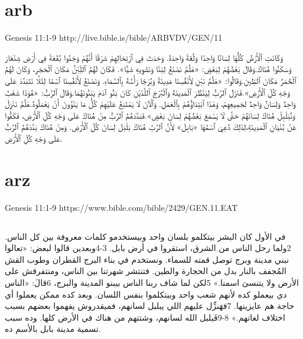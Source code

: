 \documentclass[12pt,fleqn,titlepage,twoside,a4paper]{book}
\begin{document}
\section{arb}

 Genesis 11:1-9 http://live.bible.is/bible/ARBVDV/GEN/11

\begin{arab}[utf]

وَكَانَتِ ٱلْأَرْضُ كُلُّهَا لِسَانًا وَاحِدًا وَلُغَةً وَاحِدَةً. وَحَدَثَ فِي ٱرْتِحَالِهِمْ شَرْقًا أَنَّهُمْ وَجَدُوا بُقْعَةً فِي أَرْضِ شِنْعَارَ وَسَكَنُوا هُنَاكَ.وَقَالَ بَعْضُهُمْ لِبَعْضٍ: «هَلُمَّ نَصْنَعُ لِبْنًا وَنَشْوِيهِ شَيًّا». فَكَانَ لَهُمُ ٱللِّبْنُ مَكَانَ ٱلْحَجَرِ، وَكَانَ لَهُمُ ٱلْحُمَرُ مَكَانَ ٱلطِّينِ.وَقَالُوا: «هَلُمَّ نَبْنِ لِأَنْفُسِنَا مَدِينَةً وَبُرْجًا رَأْسُهُ بِٱلسَّمَاءِ. وَنَصْنَعُ لِأَنْفُسِنَا ٱسْمًا لِئَلَّا نَتَبَدَّدَ عَلَى وَجْهِ كُلِّ ٱلْأَرْضِ».فَنَزَلَ ٱلرَّبُّ لِيَنْظُرَ ٱلْمَدِينَةَ وَٱلْبُرْجَ ٱللَّذَيْنِ كَانَ بَنُو آدَمَ يَبْنُونَهُمَا.وَقَالَ ٱلرَّبُّ: «هُوَذَا شَعْبٌ وَاحِدٌ وَلِسَانٌ وَاحِدٌ لِجَمِيعِهِمْ، وَهَذَا ٱبْتِدَاؤُهُمْ بِٱلْعَمَلِ. وَٱلْآنَ لَا يَمْتَنِعُ عَلَيْهِمْ كُلُّ مَا يَنْوُونَ أَنْ يَعْمَلُوهُ.هَلُمَّ نَنْزِلْ وَنُبَلْبِلْ هُنَاكَ لِسَانَهُمْ حَتَّى لَا يَسْمَعَ بَعْضُهُمْ لِسَانَ بَعْضٍ».فَبَدَّدَهُمُ ٱلرَّبُّ مِنْ هُنَاكَ عَلَى وَجْهِ كُلِّ ٱلْأَرْضِ، فَكَفُّوا عَنْ بُنْيَانِ ٱلْمَدِينَةِ،لِذَلِكَ دُعِيَ ٱسْمُهَا «بَابِلَ» لِأَنَّ ٱلرَّبَّ هُنَاكَ بَلْبَلَ لِسَانَ كُلِّ ٱلْأَرْضِ. وَمِنْ هُنَاكَ بَدَّدَهُمُ ٱلرَّبُّ عَلَى وَجْهِ كُلِّ ٱلْأَرْضِ.
\end{arab}

\section{arz}

 Genesis 11:1-9 https://www.bible.com/bible/2429/GEN.11.EAT

\begin{arab}[utf]

\section*{}


في الأول كان البشر بيتكلمو بلسان واحد وبيستخدمو كلمات معروفة بين كل الناس. 2ولما رحل الناس من الشرق، استقروا في أرض بابل. 3‏-4وبعدين قالوا لبعض: «تعالوا نبني مدينة وبرج توصل قمته للسماء. ونستخدم في بناء البرج القطران وطوب القش المُجفف بالنار بدل من الحجارة والطين. فتنتشر شهرتنا بين الناس، ومنتفرقش على الأرض ولا يتنسىَ اسمنا.» 5لكن لما شاف ربنا الناس بيبنو المدينة والبرج، 6قالَ: «الناس دي بيعملو كده لأنهم شعب واحد وبيتكلموا بنفس اللسان. وبعد كده ممكن يعملوا أي حاجة هم عايزينها. 7فهَنزِّل عليهم اللي يبلبل لسانهم، فميقدروش يفهموا بعضهم بسبب اختلاف لغاتهم.» 8‏-9فَبلبل الله لسانهم، وشتتهم من هناك في الأرض كلها. وده سبب تسمية مدينة بابل بالأسم ده.

\end{arab}
\end{document}

